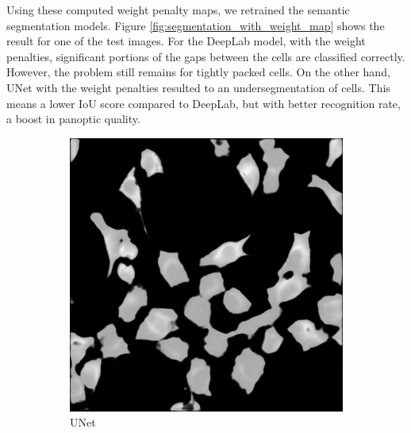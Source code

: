\documentclass[journal]{IEEEtran}
\begin{document}
Using these computed weight penalty maps, we retrained the semantic segmentation models. Figure \ref{fig:segmentation_with_weight_map} shows the result for one of the test images. For the DeepLab model, with the weight penalties, significant portions of the gaps between the cells are classified correctly. However, the problem still remains for tightly packed cells. On the other hand, UNet with the weight penalties resulted to an undersegmentation of cells. This means a lower IoU score compared to DeepLab, but with better recognition rate, a boost in panoptic quality.
\begin{figure}
\centering
\begin{subfigure}[b]{0.45\linewidth}
\includegraphics[width=\linewidth]{weighted/110115-unet.jpg}
\caption{UNet}
\end{subfigure}
\begin{subfigure}[b]{0.45\linewidth}

\end{subfigure}
\end{figure}
\end{document}
